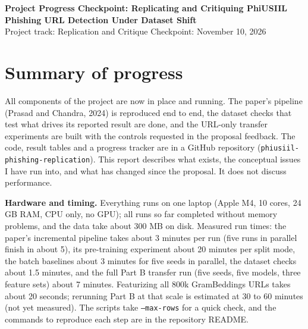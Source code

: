 \documentclass[10pt]{article}
\begin{document}
\begin{center}
{\large\bfseries Project Progress Checkpoint: Replicating and Critiquing PhiUSIIL Phishing URL Detection Under Dataset Shift}\\[2pt]
Project track: Replication and Critique \quad Checkpoint: November 10, 2026
\end{center}

\section{Summary of progress}
All components of the project are now in place and running. The paper's pipeline (Prasad and Chandra, 2024) is reproduced end to end, the dataset checks that test what drives its reported result are done, and the URL-only transfer experiments are built with the controls requested in the proposal feedback. The code, result tables and a progress tracker are in a GitHub repository (\texttt{phiusiil-phishing-replication}). This report describes what exists, the conceptual issues I have run into, and what has changed since the proposal. It does not discuss performance.

\textbf{Hardware and timing.} Everything runs on one laptop (Apple M4, 10 cores, 24 GB RAM, CPU only, no GPU); all runs so far completed without memory problems, and the data take about 300 MB on disk. Measured run times: the paper's incremental pipeline takes about 3 minutes per run (five runs in parallel finish in about 5), its pre-training experiment about 20 minutes per split mode, the batch baselines about 3 minutes for five seeds in parallel, the dataset checks about 1.5 minutes, and the full Part B transfer run (five seeds, five models, three feature sets) about 7 minutes. Featurizing all 800k GramBeddings URLs takes about 20 seconds; rerunning Part B at that scale is estimated at 30 to 60 minutes (not yet measured). The scripts take \texttt{--max-rows} for a quick check, and the commands to reproduce each step are in the repository README.
\end{document}
